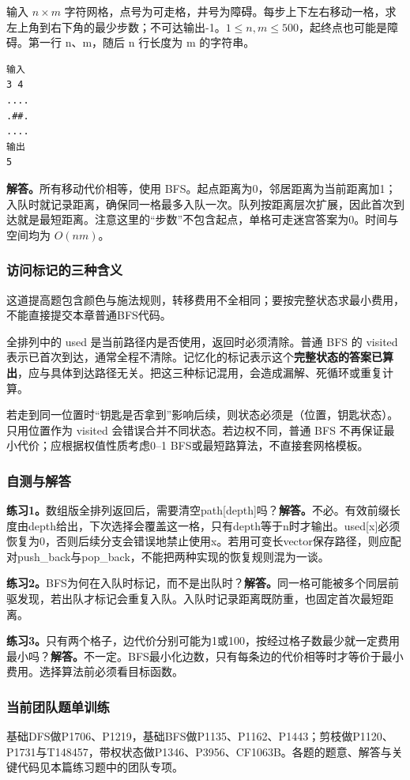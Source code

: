输入 $n\times m$ 字符网格，点号为可走格，井号为障碍。每步上下左右移动一格，求左上角到右下角的最少步数；不可达输出-1。$1\le n,m\le500$，起终点也可能是障碍。第一行 n、m，随后 n 行长度为 m 的字符串。
\begin{verbatim}
输入
3 4
....
.##.
....
输出
5
\end{verbatim}
\textbf{解答。}所有移动代价相等，使用 BFS。起点距离为0，邻居距离为当前距离加1；入队时就记录距离，确保同一格最多入队一次。队列按距离层次扩展，因此首次到达就是最短距离。注意这里的“步数”不包含起点，单格可走迷宫答案为0。时间与空间均为 $O(nm)$。

\subsubsection{访问标记的三种含义}
这道提高题包含颜色与施法规则，转移费用不全相同；要按完整状态求最小费用，不能直接提交本章普通BFS代码。

全排列中的 used 是当前路径内是否使用，返回时必须清除。普通 BFS 的 visited 表示已首次到达，通常全程不清除。记忆化的标记表示这个\textbf{完整状态的答案已算出}，应与具体到达路径无关。把这三种标记混用，会造成漏解、死循环或重复计算。

若走到同一位置时“钥匙是否拿到”影响后续，则状态必须是（位置，钥匙状态）。只用位置作为 visited 会错误合并不同状态。若边权不同，普通 BFS 不再保证最小代价；应根据权值性质考虑0--1 BFS或最短路算法，不直接套网格模板。

\subsubsection{自测与解答}
\textbf{练习1。}数组版全排列返回后，需要清空path[depth]吗？\textbf{解答。}不必。有效前缀长度由depth给出，下次选择会覆盖这一格，只有depth等于n时才输出。used[x]必须恢复为0，否则后续分支会错误地禁止使用x。若用可变长vector保存路径，则应配对push\_back与pop\_back，不能把两种实现的恢复规则混为一谈。

\textbf{练习2。}BFS为何在入队时标记，而不是出队时？\textbf{解答。}同一格可能被多个同层前驱发现，若出队才标记会重复入队。入队时记录距离既防重，也固定首次最短距离。

\textbf{练习3。}只有两个格子，边代价分别可能为1或100，按经过格子数最少就一定费用最小吗？\textbf{解答。}不一定。BFS最小化边数，只有每条边的代价相等时才等价于最小费用。选择算法前必须看目标函数。
\newpage

\subsubsection{当前团队题单训练}
基础DFS做P1706、P1219，基础BFS做P1135、P1162、P1443；剪枝做P1120、P1731与T148457，带权状态做P1346、P3956、CF1063B。各题的题意、解答与关键代码见本篇练习题中的团队专项。
